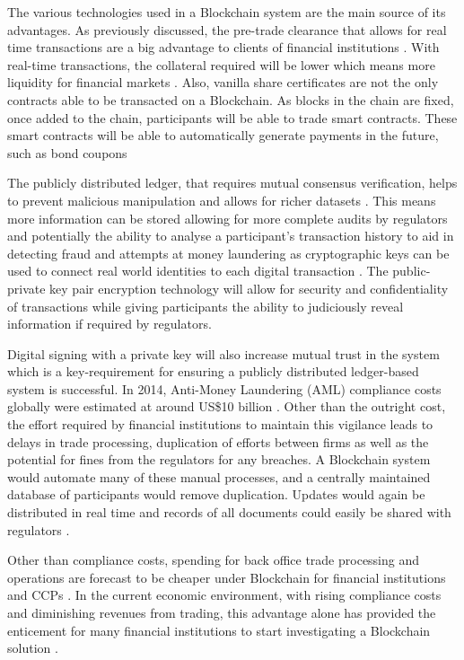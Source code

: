 \documentclass{article}
\begin{document}
The various technologies used in a Blockchain system are the main source of its advantages. As previously discussed, the pre-trade clearance that allows for real time transactions are a big advantage to clients of financial institutions \cite{gentleIntro}. With real-time transactions, the collateral required will be lower which means more liquidity for financial markets \cite{WymanEuro}.
Also, vanilla share certificates are not the only contracts able to be transacted on a Blockchain. As blocks in the chain are fixed, once added to the chain, participants will be able to trade smart contracts. These smart contracts will be able to automatically generate payments in the future, such as bond coupons \cite{DBS}

The publicly distributed ledger, that requires mutual consensus verification, helps to prevent malicious manipulation and allows for richer datasets \cite{WymanEuro}. This means more information can be stored allowing for more complete audits by regulators and potentially the ability to analyse a participant's transaction history to aid in detecting fraud and attempts at money laundering as cryptographic keys can be used to connect real world identities to each digital transaction \cite{Deloitte}. The public-private key pair encryption technology will allow for security and confidentiality of transactions while giving participants the ability to judiciously reveal information if required by regulators\cite{WymanEuro}. 

Digital signing with a private key will also increase mutual trust in the system which is a key-requirement for ensuring a publicly distributed ledger-based system is successful. In 2014, Anti-Money Laundering (AML) compliance costs globally were estimated at around US\$10 billion \cite{KPMG}. Other than the outright cost, the effort required by financial institutions to maintain this vigilance leads to delays in trade processing, duplication of efforts between firms as well as the potential for fines from the regulators for any breaches. A Blockchain system would automate many of these manual processes, and a centrally maintained database of participants would remove duplication. Updates would again be distributed in real time and records of all documents could easily be shared with regulators \cite{Deloitte}. 

Other than compliance costs, spending for back office trade processing and operations are forecast to be cheaper under Blockchain for financial institutions and CCPs \cite{WymanEuro}. In the current economic environment, with rising compliance costs and diminishing revenues from trading, this advantage alone has provided the enticement for many financial institutions to start investigating a Blockchain solution \cite{Deloitte}.
\end{document}
